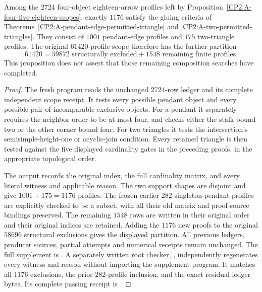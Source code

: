 \begin{proposition}
\label{CP2:A-four-eighteen-gluing-scope}
Among the $2724$ four-object eighteen-arrow profiles left
by Proposition~\ref{CP2:A-four-five-eighteen-scopes}, exactly
$1176$ satisfy the gluing criteria of
Theorems~\ref{CP2:A-pendant-edge-permitted-triangle} and
\ref{CP2:A-two-permitted-triangles}. They consist of $1001$
pendant-edge profiles and $175$ two-triangle profiles.
The original $61420$-profile scope therefore has the
further partition
\[
 61420=59872\text{ structurally excluded}
       +1548\text{ remaining finite profiles}.
\]
This proposition does not assert that those remaining
composition searches have completed.
\end{proposition}
\begin{proof}
The fresh program
reads the unchanged $2724$-row ledger and its complete
independent scope receipt. It tests every possible pendant
object and every possible pair of incomparable exclusive
objects. For a pendant it separately requires the neighbor
order to be at most four, and checks either the stalk bound
two or the other corner bound four. For two triangles it
tests the intersection's semisimple-height-one or acyclic-join
condition. Every retained triangle is then tested against
the five displayed cardinality gates in the preceding
proofs, in the appropriate topological order.

The output records the original index, the full cardinality
matrix, and every literal witness and applicable reason.
The two support shapes are disjoint and give $1001+175=1176$
profiles. The frozen earlier $282$ singleton-pendant profiles
are explicitly checked to be a subset, with all their old
matrix and proof-source bindings preserved. The remaining
$1548$ rows are written in their original order and their
original indices are retained. Adding the $1176$ new proofs
to the original $58696$ structural exclusions gives the
displayed partition. All previous ledgers, producer sources,
partial attempts and numerical receipts remain unchanged.
The full supplement is
.
A separately written root checker,
, independently
regenerates every witness and reason without importing
the supplement program. It matches all $1176$ exclusions,
the prior $282$-profile inclusion, and the exact residual
ledger bytes. Its complete passing receipt is
.
\end{proof}
